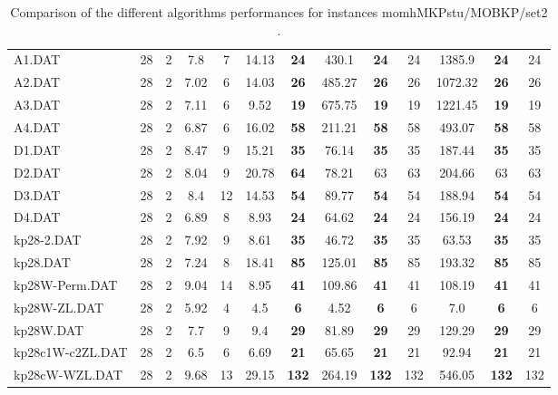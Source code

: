 \begin{table}[h]
{\begin{tabular}{lcccccccccccc}
A1.DAT & 28 & 2 &  \textcolor{blue2}{7.8} & 7 & 14.13 &  \textbf{24} & 430.1 &  \textbf{24} & 24 & 1385.9 &  \textbf{24} & 24 \\
A2.DAT & 28 & 2 &  \textcolor{blue2}{7.02} & 6 & 14.03 &  \textbf{26} & 485.27 &  \textbf{26} & 26 & 1072.32 &  \textbf{26} & 26 \\
A3.DAT & 28 & 2 &  \textcolor{blue2}{7.11} & 6 & 9.52 &  \textbf{19} & 675.75 &  \textbf{19} & 19 & 1221.45 &  \textbf{19} & 19 \\
A4.DAT & 28 & 2 &  \textcolor{blue2}{6.87} & 6 & 16.02 &  \textbf{58} & 211.21 &  \textbf{58} & 58 & 493.07 &  \textbf{58} & 58 \\
D1.DAT & 28 & 2 &  \textcolor{blue2}{8.47} & 9 & 15.21 &  \textbf{35} & 76.14 &  \textbf{35} & 35 & 187.44 &  \textbf{35} & 35 \\
D2.DAT & 28 & 2 &  \textcolor{blue2}{8.04} & 9 & 20.78 &  \textbf{64} & 78.21 & 63 & 63 & 204.66 & 63 & 63 \\
D3.DAT & 28 & 2 &  \textcolor{blue2}{8.4} & 12 & 14.53 &  \textbf{54} & 89.77 &  \textbf{54} & 54 & 188.94 &  \textbf{54} & 54 \\
D4.DAT & 28 & 2 &  \textcolor{blue2}{6.89} & 8 & 8.93 &  \textbf{24} & 64.62 &  \textbf{24} & 24 & 156.19 &  \textbf{24} & 24 \\
kp28-2.DAT & 28 & 2 &  \textcolor{blue2}{7.92} & 9 & 8.61 &  \textbf{35} & 46.72 &  \textbf{35} & 35 & 63.53 &  \textbf{35} & 35 \\
kp28.DAT & 28 & 2 &  \textcolor{blue2}{7.24} & 8 & 18.41 &  \textbf{85} & 125.01 &  \textbf{85} & 85 & 193.32 &  \textbf{85} & 85 \\
kp28W-Perm.DAT & 28 & 2 & 9.04 & 14 &  \textcolor{blue2}{8.95} &  \textbf{41} & 109.86 &  \textbf{41} & 41 & 108.19 &  \textbf{41} & 41 \\
kp28W-ZL.DAT & 28 & 2 & 5.92 & 4 &  \textcolor{blue2}{4.5} &  \textbf{6} & 4.52 &  \textbf{6} & 6 & 7.0 &  \textbf{6} & 6 \\
kp28W.DAT & 28 & 2 &  \textcolor{blue2}{7.7} & 9 & 9.4 &  \textbf{29} & 81.89 &  \textbf{29} & 29 & 129.29 &  \textbf{29} & 29 \\
kp28c1W-c2ZL.DAT & 28 & 2 &  \textcolor{blue2}{6.5} & 6 & 6.69 &  \textbf{21} & 65.65 &  \textbf{21} & 21 & 92.94 &  \textbf{21} & 21 \\
kp28cW-WZL.DAT & 28 & 2 &  \textcolor{blue2}{9.68} & 13 & 29.15 &  \textbf{132} & 264.19 &  \textbf{132} & 132 & 546.05 &  \textbf{132} & 132 \\
\bottomrule
\end{tabular}
}%
\caption{Comparison of the different algorithms performances for instances momhMKPstu/MOBKP/set2 .}
\label{tab:table_compare_momhMKPstu/MOBKP/set2 }
\end{table}
